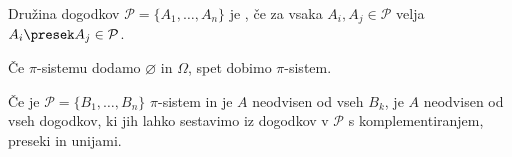 
\begin{definicija}
  Družina dogodkov $\mathcal{P} = \{A_1, \ldots, A_n\}$ je ,
  če za vsaka $A_i, A_j \in \mathcal{P}$ velja $A_i \presek A_j \in
  \mathcal{P}$.
\end{definicija}

\begin{opomba}
  Če $\pi$-sistemu dodamo $\varnothing$ in $\Omega$, spet dobimo $\pi$-sistem.
\end{opomba}

\begin{izrek}
  Če je $\mathcal{P} = \{B_1, \ldots, B_n\}$ $\pi$-sistem in je $A$ neodvisen od
  vseh $B_k$, je $A$ neodvisen od vseh dogodkov, ki jih lahko sestavimo iz
  dogodkov v $\mathcal{P}$ s komplementiranjem, preseki in unijami.
\end{izrek}

